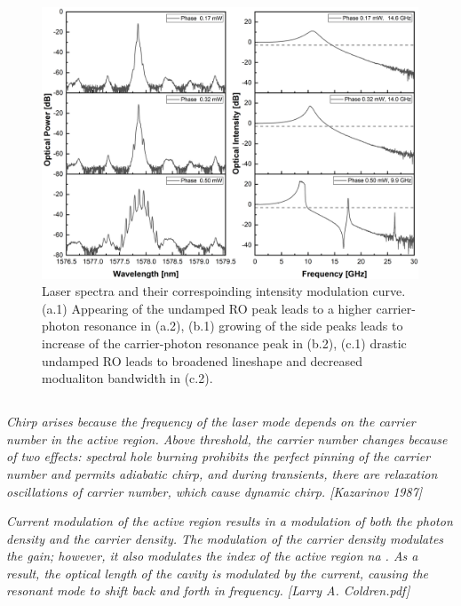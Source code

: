 \begin{figure}[ht]
    \centering
    \includegraphics[width=\linewidth]{figures/Umdamped_RO_and_bandwidth_grating_4621.png}
    \caption{Laser spectra and their correspoinding intensity modulation curve. (a.1) Appearing of the undamped RO peak leads to a higher carrier-photon resonance in (a.2), (b.1) growing of the side peaks leads to increase of the carrier-photon resonance peak in (b.2), (c.1) drastic undamped RO leads to broadened lineshape and decreased modualiton bandwidth in (c.2).}
    \label{fig:undamped_RO}
\end{figure}

\subsection{}
\textit{Chirp arises because the frequency of the laser mode depends on the carrier number in the active region. Above threshold, the carrier number changes because of two effects: spectral hole burning prohibits the perfect pinning of the carrier number and permits adiabatic chirp, and during transients, there are relaxation oscillations of carrier number, which cause dynamic chirp. [Kazarinov 1987]}

\textit{Current modulation of the active region results in a modulation of both the photon density and the carrier density. The modulation of the carrier density modulates the gain; however, it also modulates the index of the active region na . As a result, the optical length of the cavity is modulated by the current, causing the resonant mode to shift back and forth in frequency. [Larry A. Coldren.pdf]}


